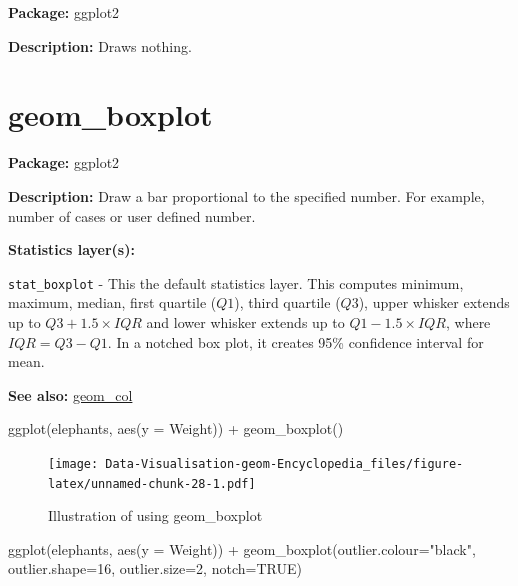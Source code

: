 \documentclass[
]{book}
\newenvironment{Shaded}{\begin{snugshade}}{\end{snugshade}}
\newcommand{\AttributeTok}[1]{\textcolor[rgb]{0.77,0.63,0.00}{#1}}
\newcommand{\ConstantTok}[1]{\textcolor[rgb]{0.00,0.00,0.00}{#1}}
\newcommand{\DecValTok}[1]{\textcolor[rgb]{0.00,0.00,0.81}{#1}}
\newcommand{\FunctionTok}[1]{\textcolor[rgb]{0.00,0.00,0.00}{#1}}
\newcommand{\NormalTok}[1]{#1}
\newcommand{\SpecialCharTok}[1]{\textcolor[rgb]{0.00,0.00,0.00}{#1}}
\newcommand{\StringTok}[1]{\textcolor[rgb]{0.31,0.60,0.02}{#1}}
\begin{document}
\textbf{Package: } ggplot2 \autocite{R-ggplot2}

\textbf{Description: } Draws nothing.

\hypertarget{geom_boxplot}{%
\section{geom\_boxplot}\label{geom_boxplot}}

\textbf{Package: } ggplot2 \autocite{R-ggplot2}

\textbf{Description: } Draw a bar proportional to the specified number. For example, number of cases or user defined number.

\textbf{Statistics layer(s): }

\texttt{stat\_boxplot} - This the default statistics layer. This computes minimum, maximum, median, first quartile (\(Q1\)), third quartile (\(Q3\)), upper whisker extends up to \(Q3 + 1.5 \times IQR\) and lower whisker extends up to \(Q1 - 1.5 \times IQR\), where \(IQR = Q3 - Q1\). In a notched box plot, it creates 95\% confidence interval for mean.

\textbf{See also: } \protect\hyperlink{col}{geom\_col}

\begin{Shaded}
\begin{Highlighting}[]
\FunctionTok{ggplot}\NormalTok{(elephants, }\FunctionTok{aes}\NormalTok{(}\AttributeTok{y =}\NormalTok{ Weight)) }\SpecialCharTok{+} 
  \FunctionTok{geom\_boxplot}\NormalTok{()}
\end{Highlighting}
\end{Shaded}

\begin{figure}
\centering
\texttt{[image: Data-Visualisation-geom-Encyclopedia\_files/figure-latex/unnamed-chunk-28-1.pdf]}
\caption{\label{fig:unnamed-chunk-28}Illustration of using geom\_boxplot}
\end{figure}

\begin{Shaded}
\begin{Highlighting}[]
\FunctionTok{ggplot}\NormalTok{(elephants, }\FunctionTok{aes}\NormalTok{(}\AttributeTok{y =}\NormalTok{ Weight)) }\SpecialCharTok{+} 
\FunctionTok{geom\_boxplot}\NormalTok{(}\AttributeTok{outlier.colour=}\StringTok{"black"}\NormalTok{, }\AttributeTok{outlier.shape=}\DecValTok{16}\NormalTok{,}
             \AttributeTok{outlier.size=}\DecValTok{2}\NormalTok{, }\AttributeTok{notch=}\ConstantTok{TRUE}\NormalTok{)}
\end{Highlighting}
\end{Shaded}
\end{document}
